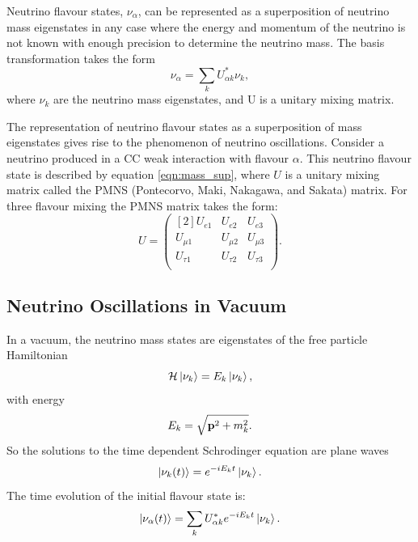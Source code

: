 Neutrino flavour states, $\nu_\alpha$, can be represented as a superposition of 
neutrino mass eigenstates in any case where the energy and momentum of the 
neutrino is not known with enough precision to determine the neutrino mass. 
The basis transformation takes the form
\begin{equation}
	\label{eqn:mass_sup}
	\nu_\alpha = \sum_{k} U^*_{\alpha k} \nu_k,
\end{equation}
where $\nu_k$ are the neutrino mass eigenstates, and U is a unitary mixing
matrix. 

The representation of neutrino flavour states as a superposition of mass 
eigenstates gives rise to the phenomenon of neutrino oscillations. Consider a 
neutrino produced in a CC weak interaction with flavour \(\alpha\). 
This neutrino flavour state is described by equation \ref{eqn:mass_sup},
where \(U\) is a unitary mixing matrix called the PMNS 
(Pontecorvo, Maki, Nakagawa, and Sakata) matrix. For three flavour mixing the 
PMNS matrix takes the form:
\begin{equation}
	\label{eqn:pmns}
	U = 
	\begin{pmatrix}[2]
		U_{e1} & U_{e2} & U_{e3} \\
		U_{\mu1} & U_{\mu2} & U_{\mu3} \\
		U_{\tau1} & U_{\tau2} & U_{\tau3} \\
	\end{pmatrix}.
\end{equation}

\subsection{Neutrino Oscillations in Vacuum}
In a vacuum, the neutrino mass states are eigenstates of the free particle Hamiltonian
\begin{equation}
	\label{eqn:ham_eig}
	{\cal H} \ket{\nu_k} = E_k \ket{\nu_k},
\end{equation}
with energy
\begin{equation}
	\label{eqn:nu_en}
	E_k = \sqrt{\vb{p}^2 + m_k^2}.
\end{equation}
So the solutions to the time dependent Schrodinger equation are plane waves
\begin{equation}
	\label{eqn:plane_wave}
	\ket{\nu_k(t)} = e^{-iE_kt}\ket{\nu_k}.
\end{equation}
The time evolution of the initial flavour state is:
\begin{equation}
	\label{eqn:flavour_time_mass}
	\ket{\nu_\alpha(t)} = \sum_k U_{\alpha k}^* e^{-iE_kt} \ket{\nu_k}.
\end{equation}

